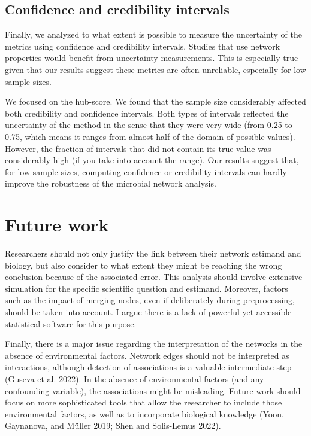 \documentclass[
  a4paper,
]{article}
\begin{document}
\hypertarget{confidence-and-credibility-intervals-1}{%
\subsection{Confidence and credibility
intervals}\label{confidence-and-credibility-intervals-1}}

Finally, we analyzed to what extent is possible to measure the
uncertainty of the metrics using confidence and credibility intervals.
Studies that use network properties would benefit from uncertainty
measurements. This is especially true given that our results suggest
these metrics are often unreliable, especially for low sample sizes.

We focused on the hub-score. We found that the sample size considerably
affected both credibility and confidence intervals. Both types of
intervals reflected the uncertainty of the method in the sense that they
were very wide (from 0.25 to 0.75, which means it ranges from almost
half of the domain of possible values). However, the fraction of
intervals that did not contain its true value was considerably high (if
you take into account the range). Our results suggest that, for low
sample sizes, computing confidence or credibility intervals can hardly
improve the robustness of the microbial network analysis.

\hypertarget{future-work}{%
\section{Future work}\label{future-work}}

Researchers should not only justify the link between their network
estimand and biology, but also consider to what extent they might be
reaching the wrong conclusion because of the associated error. This
analysis should involve extensive simulation for the specific scientific
question and estimand. Moreover, factors such as the impact of merging
nodes, even if deliberately during preprocessing, should be taken into
account. I argue there is a lack of powerful yet accessible statistical
software for this purpose.

Finally, there is a major issue regarding the interpretation of the
networks in the absence of environmental factors. Network edges should
not be interpreted as interactions, although detection of associations
is a valuable intermediate step (Guseva et al. 2022). In the absence of
environmental factors (and any confounding variable), the associations
might be misleading. Future work should focus on more sophisticated
tools that allow the researcher to include those environmental factors,
as well as to incorporate biological knowledge (Yoon, Gaynanova, and
Müller 2019; Shen and Solis-Lemus 2022).
\end{document}
